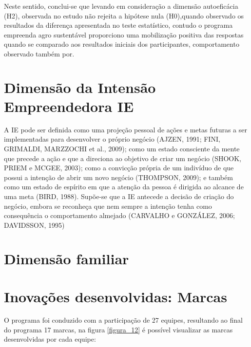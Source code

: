 \newpage

Neste sentido, conclui-se que levando em consideração a dimensão autoeficácia (H2), observada no estudo não rejeita a hipótese nula (H0),quando observado os resultados da diferença apresentada no teste estatístico, contudo o programa empreenda agro sustentável proporciono uma mobilização positiva das respostas quando se comparado aos resultados iniciais dos participantes, comportamento observado também por. 




\section{Dimensão da Intensão Empreendedora IE}



A IE pode ser definida como uma projeção pessoal de ações e metas futuras a ser implementadas para desenvolver o próprio negócio (AJZEN, 1991; FINI, GRIMALDI, MARZZOCHI et al., 2009); como um estado consciente da mente que precede a
ação e que a direciona ao objetivo de criar um negócio (SHOOK, PRIEM e MCGEE, 2003); como a convicção própria de um
indivíduo de que possui a intenção de abrir um novo negócio (THOMPSON, 2009); e também como um estado de espírito
em que a atenção da pessoa é dirigida ao alcance de uma meta (BIRD, 1988). Supõe-se que a IE antecede a decisão de criação do negócio, embora se reconheça que nem sempre a intenção tenha como consequência o comportamento almejado
(CARVALHO e GONZÁLEZ, 2006; DAVIDSSON, 1995)


\section{Dimensão familiar}

\section{Inovações desenvolvidas: Marcas}

O programa foi conduzido com a participação de 27 equipes, resultando ao final do programa  17 marcas, na figura \ref{figura_12} é possível visualizar as marcas desenvolvidas por cada equipe: 

